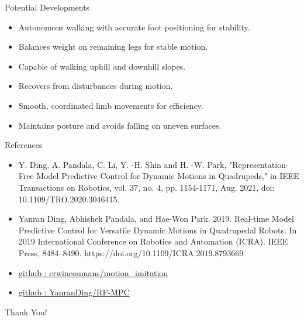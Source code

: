 \documentclass{beamer}
\begin{document}
\begin{frame}{Potential Developments}
\begin{itemize}
    \item Autonomous walking with accurate foot positioning for stability.
    \item Balances weight on remaining legs for stable motion.
    \item Capable of walking uphill and downhill slopes.
    \item Recovers from disturbances during motion.
    \item Smooth, coordinated limb movements for efficiency.
    \item Maintains posture and avoids falling on uneven surfaces.
\end{itemize}
\end{frame}\normalfont


\begin{frame}{References}

\begin{itemize}
  \item Y. Ding, A. Pandala, C. Li, Y. -H. Shin and H. -W. Park, "Representation-Free Model Predictive Control for Dynamic Motions in Quadrupeds," in IEEE Transactions on Robotics, vol. 37, no. 4, pp. 1154-1171, Aug. 2021, doi: 10.1109/TRO.2020.3046415.

  \item Yanran Ding, Abhishek Pandala, and Hae-Won Park. 2019. Real-time Model Predictive Control for Versatile Dynamic Motions in Quadrupedal Robots. In 2019 International Conference on Robotics and Automation (ICRA). IEEE Press, 8484–8490. https://doi.org/10.1109/ICRA.2019.8793669


  \item \href{https://github.com/erwincoumans/motion_imitation/tree/master/mpc_controller}{github : erwincoumans/motion\_imitation}

  \item \href{https://github.com/YanranDing/RF-MPC}{github : YanranDing/RF-MPC}

  
\end{itemize}

\end{frame}\normalfont
    
\begin{frame}
	\LARGE{Thank You!}
\end{frame}\normalfont
\end{document}
